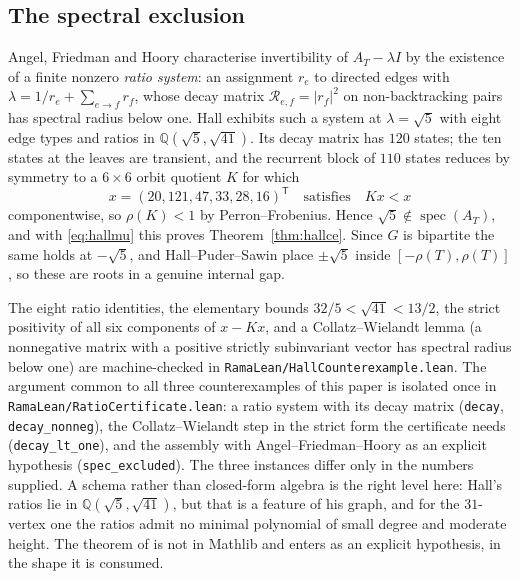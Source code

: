 \documentclass[11pt]{article}
\theoremstyle{remark}
\begin{document}
\subsection{The spectral exclusion}

Angel, Friedman and Hoory \cite{AFH} characterise invertibility of $A_T-\lambda I$ by the
existence of a finite nonzero \emph{ratio system}: an assignment $r_e$ to directed edges
with $\lambda=1/r_e+\sum_{e\to f}r_f$, whose decay matrix $\mathcal R_{e,f}=|r_f|^2$ on
non-backtracking pairs has spectral radius below one. Hall exhibits such a system at
$\lambda=\sqrt5$ with eight edge types and ratios in $\mathbb Q(\sqrt5,\sqrt{41})$. Its
decay matrix has $120$ states; the ten states at the leaves are transient, and the
recurrent block of $110$ states reduces by symmetry to a $6\times6$ orbit quotient $K$ for
which
\[
   x=(20,121,47,33,28,16)^{\mathsf T}\quad\text{satisfies}\quad Kx<x
\]
componentwise, so $\rho(K)<1$ by Perron--Frobenius. Hence $\sqrt5\notin
\operatorname{spec}(A_T)$, and with \eqref{eq:hallmu} this proves
Theorem~\ref{thm:hallce}. Since $G$ is bipartite the same holds at $-\sqrt5$, and
Hall--Puder--Sawin place $\pm\sqrt5$ inside $[-\rho(T),\rho(T)]$, so these are roots in a
genuine internal gap.

The eight ratio identities, the elementary bounds $32/5<\sqrt{41}<13/2$, the strict
positivity of all six components of $x-Kx$, and a Collatz--Wielandt lemma (a nonnegative
matrix with a positive strictly subinvariant vector has spectral radius below one) are
machine-checked in \texttt{RamaLean/HallCounterexample.lean}. The argument common to all three
counterexamples of this paper is isolated once in
\texttt{RamaLean/RatioCertificate.lean}: a ratio system with its decay matrix
(\texttt{decay}, \texttt{decay\_nonneg}), the Collatz--Wielandt step in the strict form the
certificate needs (\texttt{decay\_lt\_one}), and the assembly with Angel--Friedman--Hoory as an
explicit hypothesis (\texttt{spec\_excluded}). The three instances differ only in the numbers
supplied. A schema rather than closed-form algebra is the right level here: Hall's ratios lie
in $\mathbb{Q}(\sqrt5,\sqrt{41})$, but that is a feature of his graph, and for the $31$-vertex
one the ratios admit no minimal polynomial of small degree and moderate height. The theorem of \cite{AFH} is
not in Mathlib and enters as an explicit hypothesis, in the shape it is consumed.
\end{document}
